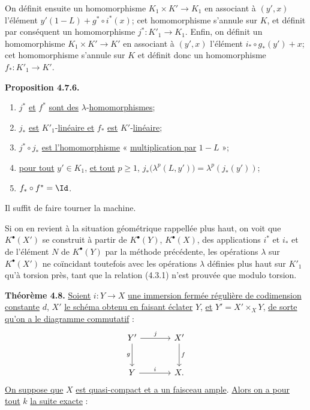 
On
définit ensuite un homomorphisme \(K_1\times K'\to K_1\) en associant à \((y',x)\) l'élément \(y'(1-L)+g^*\circ i^*(x)\); cet homomorphisme s'annule sur \(K\), et définit par conséquent un homomorphisme \(j^*:K'_1\longrightarrow K_1\). Enfin, on définit un homomorphisme \(K_1\times K'\to K'\) en associant à \((y',x)\) l'élément \(i_*\circ g_*(y')+x\); cet homomorphisme s'annule sur \(K\) et définit donc un homomorphisme \(f_*:K'_1\longrightarrow K'\).

\textbf{Proposition 4.7.6.}
\begin{enumerate}[label=\roman*)]
\item \(j^*\) \uline{et} \(f^*\) \uline{sont des} \(\lambda\)-\uline{homomorphismes};
\item \(j_*\) \uline{est} \(K'_1\)-\uline{linéaire et} \(f_*\) \uline{est} \(K'\)-\uline{linéaire};
\item \(j^*\circ j_*\) \uline{est l'homomorphisme} « \uline{multiplication par} \(1-L\) »;
\item \uline{pour tout} \(y'\in K_1\), \uline{et tout} \(p\ge1\), \(j_*\bigl(\lambda^p(L,y')\bigr)=\lambda^p(j_*(y'))\);
\item \(f_*\circ f^*=\Id\).
\end{enumerate}

Il suffit de faire tourner la machine.

Si on en revient à la situation géométrique rappellée plus haut, on voit que \(K^{\bullet}(X')\) se construit à partir de \(K^{\bullet}(Y)\), \(K^{\bullet}(X)\), des applications \(i^*\) et \(i_*\) et de l'élément \(N\) de \(K^{\bullet}(Y)\) par la méthode précédente, les opérations \(\lambda\) sur \(K^{\bullet}(X')\) ne coïncidant toutefois avec les opérations \(\lambda\) définies plus haut sur \(K'_1\) qu'à torsion près, tant que la relation (4.3.1) n'est prouvée que modulo torsion.

\textbf{Théorème 4.8.} \uline{Soient} \(i:Y\to X\) \uline{une immersion fermée régulière de codimension constante} \(d\), \(X'\) \uline{le schéma obtenu en faisant éclater} \(Y\), \uline{et} \(Y'=X'\times_XY\), \uline{de sorte qu'on a le diagramme commutatif} :
\[
\begin{tikzcd}[column sep=large,row sep=large]
Y' \arrow[r,"j"] \arrow[d,"g"'] & X' \arrow[d,"f"]\\
Y \arrow[r,"i"] & X.
\end{tikzcd}
\]
\uline{On suppose que} \(X\) \uline{est quasi-compact et a un faisceau ample}. \uline{Alors on a pour tout} \(k\) \uline{la suite
exacte} :
